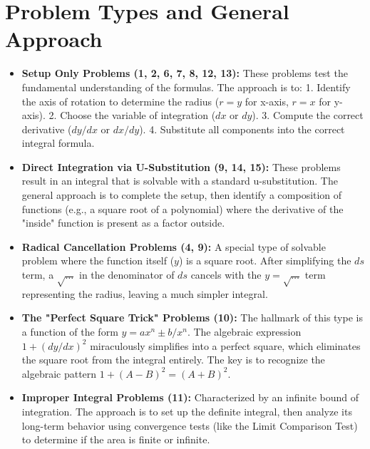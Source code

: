 \documentclass{article}
\begin{document}
\section{Problem Types and General Approach}
\begin{itemize}
    \item \textbf{Setup Only Problems (1, 2, 6, 7, 8, 12, 13):} These problems test the fundamental understanding of the formulas. The approach is to: 1. Identify the axis of rotation to determine the radius (\(r=y\) for x-axis, \(r=x\) for y-axis). 2. Choose the variable of integration (\(dx\) or \(dy\)). 3. Compute the correct derivative (\(dy/dx\) or \(dx/dy\)). 4. Substitute all components into the correct integral formula.
    \item \textbf{Direct Integration via U-Substitution (9, 14, 15):} These problems result in an integral that is solvable with a standard u-substitution. The general approach is to complete the setup, then identify a composition of functions (e.g., a square root of a polynomial) where the derivative of the "inside" function is present as a factor outside.
    \item \textbf{Radical Cancellation Problems (4, 9):} A special type of solvable problem where the function itself (\(y\)) is a square root. After simplifying the \(ds\) term, a \(\sqrt{\dots}\) in the denominator of \(ds\) cancels with the \(y=\sqrt{\dots}\) term representing the radius, leaving a much simpler integral.
    \item \textbf{The "Perfect Square Trick" Problems (10):} The hallmark of this type is a function of the form \(y=ax^n \pm b/x^n\). The algebraic expression \(1+(dy/dx)^2\) miraculously simplifies into a perfect square, which eliminates the square root from the integral entirely. The key is to recognize the algebraic pattern \(1 + (A-B)^2 = (A+B)^2\).
    \item \textbf{Improper Integral Problems (11):} Characterized by an infinite bound of integration. The approach is to set up the definite integral, then analyze its long-term behavior using convergence tests (like the Limit Comparison Test) to determine if the area is finite or infinite.
\end{itemize}
\end{document}
